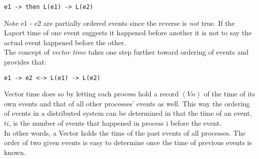 \begin{lstlisting}
e1 -> then L(e1) -> L(e2)
\end{lstlisting}

Note e1 - e2 are partially ordered events since the reverse is \emph{not} true. If the Laport time of one event suggests it happened before another it is not to say the actual event happened before the other.\\

The concept of \emph{vector time} takes one step further toward ordering of events and provides that:

\begin{lstlisting}
e1 -> e2 <-> L(e1) -> L(e2)
\end{lstlisting}

Vector time does so by letting each process hold a record   $(Vn)$ of the time of its own events and that of all other processes' events as well. This way the ordering of events in a distributed system can be determined in that the time of an event, $ti$, is the number of events that happened in process i before the event.\\

In other words, a Vector holds the time of the past events of all processes. The order of two given events is easy to determine once the time of previous events is known. \\
  

